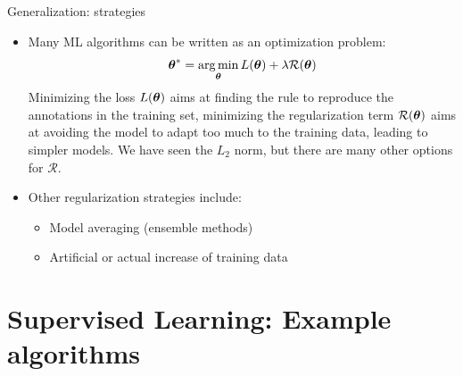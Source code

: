 \documentclass[xcolor=pdftex,dvipsnames,table]{beamer}
\begin{document}
\begin{frame}{Generalization: strategies}
\begin{itemize}
\item Many ML algorithms can be written as an optimization problem:
\begin{equation*}
\boldsymbol{\theta} ^{\ast} = \operatorname*{arg\,min}_{\boldsymbol{\theta}} L (\boldsymbol{\theta}) + \lambda \mathcal{R}(\boldsymbol{\theta})
\end{equation*}
Minimizing the loss $L (\boldsymbol{\theta})$ aims at finding the rule to reproduce the annotations in the training set, minimizing the regularization term $\mathcal{R}(\boldsymbol{\theta})$ aims at avoiding the model to adapt too much to the training data, leading to simpler models. We have seen the $L_2$ norm, but there are many other options for $\mathcal{R}$.
\item Other regularization strategies include:
\begin{itemize}
\item Model averaging (ensemble methods)
\item Artificial or actual increase of training data
\end{itemize}
\end{itemize}
\end{frame}

\section{Supervised Learning: Example algorithms}


\end{document}
